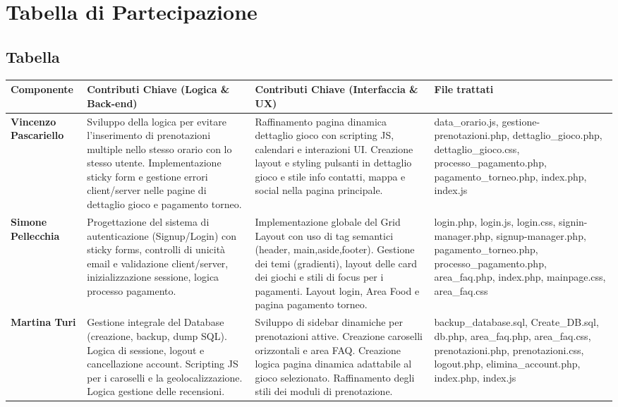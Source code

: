 \documentclass[a4paper, twoside]{report}
\begin{document}
\chapter{Tabella di Partecipazione}
\section{Tabella}
\renewcommand{\arraystretch}{1.5}
\begin{tabularx}{\textwidth}{|l|X|X|L|}
  \hline
   \textbf{Componente} & \textbf{Contributi Chiave (Logica \& Back-end)} & \textbf{Contributi Chiave (Interfaccia \& UX)} & \textbf{File trattati}\\ \hline
  \textbf{Vincenzo Pascariello} & Sviluppo della logica per evitare l'inserimento di prenotazioni multiple nello stesso orario con lo stesso utente. Implementazione sticky form e gestione errori client/server nelle pagine di dettaglio gioco e pagamento torneo.
                                & Raffinamento pagina dinamica dettaglio gioco con scripting JS, calendari e interazioni UI. Creazione layout e styling pulsanti in dettaglio gioco e stile info contatti, mappa e social nella pagina principale. 
                                & data\_orario.js, gestione-prenotazioni.php, dettaglio\_gioco.php, dettaglio\_gioco.css, processo\_pagamento.php, pagamento\_torneo.php, index.php, index.js \\ \hline

  \textbf{Simone Pellecchia}    & Progettazione del sistema di autenticazione (Signup/Login) con sticky forms, controlli di unicità email e validazione client/server, inizializzazione sessione, logica processo pagamento.
                                & Implementazione globale del Grid Layout con uso di tag semantici (header, main,aside,footer). Gestione dei temi (gradienti), layout delle card dei giochi e stili di focus per i pagamenti. Layout login, Area Food e pagina pagamento torneo. 
                                & login.php, login.js, login.css, signin-manager.php, signup-manager.php, pagamento\_torneo.php, processo\_pagamento.php, area\_faq.php, index.php, mainpage.css, area\_faq.css \\ \hline

  \textbf{Martina Turi}         & Gestione integrale del Database (creazione, backup, dump SQL). Logica di sessione, logout e cancellazione account. Scripting JS per i caroselli e la geolocalizzazione. Logica gestione delle recensioni.
                                & Sviluppo di sidebar dinamiche per prenotazioni attive. Creazione caroselli orizzontali e area FAQ. Creazione logica pagina dinamica adattabile al gioco selezionato. Raffinamento degli stili dei moduli di prenotazione.
                                & backup\_database.sql, Create\_DB.sql, db.php, area\_faq.php, area\_faq.css, prenotazioni.php, prenotazioni.css, logout.php, elimina\_account.php, index.php, index.js \\ \hline
\end{tabularx}
\renewcommand{\arraystretch}{1}
\end{document}
